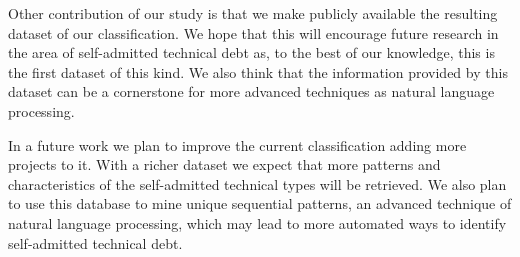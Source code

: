 Other contribution of our study is that we make publicly available the resulting dataset of our classification. We hope that this will encourage future research in the area of self-admitted technical debt as, to the best of our knowledge, this is the first dataset of this kind. We also think that the information provided by this dataset can be a cornerstone for more advanced techniques as natural language processing.   

In a future work we plan to improve the current classification adding more projects to it. With a richer dataset we expect that more patterns and characteristics of the self-admitted technical types will be retrieved. We also plan to use this database to mine unique sequential patterns, an advanced technique of natural language processing, which may lead to more automated ways to identify self-admitted technical debt. 

